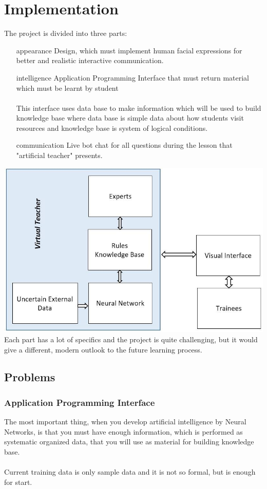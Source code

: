 \documentclass[a4paper, 12pt]{article}
\begin{document}
	\section{Implementation}
		The project is divided into three parts:
		\begin{itemize}
			\item[appearance] Design, which must implement human facial expressions for better and realistic interactive communication. 
			\item[intelligence] Application Programming Interface that must return material which must be learnt by student \\ \\ This interface uses data base to make information which will be used to build knowledge base where data base is simple data about how students visit resources and knowledge base is system of logical conditions.
			\item[communication] Live bot chat for all questions during the lesson that "artificial teacher" presents. 
		\end{itemize}
		{\centering
			\includegraphics[width=\textwidth]{schema.jpg}
		}
		Each part has a lot of specifics and the project is quite challenging, but it would give a different, modern outlook to the future learning process.
		\subsection{Problems}
			\subsubsection{Application Programming Interface}
				The most important thing, when you develop artificial intelligence by Neural Networks, is that you must have enough information, which is performed as systematic organized data, that you will use as material for building knowledge base. \\ \\
				Current training data is only sample data and it is not so formal, but is enough for start.
\end{document}
